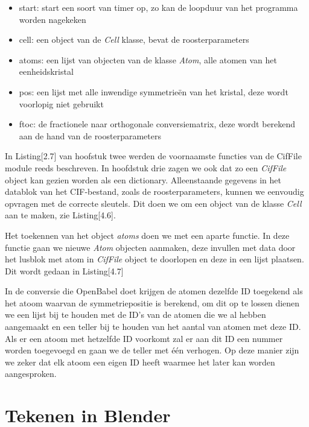 \begin{itemize}
\item start: start een soort van timer op, zo kan de loopduur van het programma worden nagekeken
\item cell: een object van de \textit{Cell} klasse, bevat de roosterparameters
\item atoms: een lijst van objecten van de klasse \textit{Atom}, alle atomen van het eenheidskristal
\item pos: een lijst met alle inwendige symmetrieën van het kristal, deze wordt voorlopig niet gebruikt
\item ftoc: de fractionele naar orthogonale conversiematrix, deze wordt berekend aan de hand van de roosterparameters
\end{itemize}

In Listing[2.7] van hoofstuk twee werden de voornaamste functies van de CifFile module reeds beschreven. In hoofdstuk drie zagen we ook dat zo een \textit{CifFile} object kan gezien worden als een dictionary. Alleenstaande gegevens in het datablok van het CIF-bestand, zoals de roosterparameters, kunnen we eenvoudig opvragen met de correcte sleutels. Dit doen we om een object van de klasse \textit{Cell} aan te maken, zie Listing[4.6].



Het toekennen van het object \textit{atoms} doen we met een aparte functie. In deze functie gaan we nieuwe \textit{Atom} objecten aanmaken, deze invullen met data door het lusblok met atom in \textit{CifFile} object te doorlopen en deze in een lijst plaatsen. Dit wordt gedaan in Listing[4.7] 



In de conversie die OpenBabel doet krijgen de atomen dezelfde ID toegekend als het atoom waarvan de symmetriepositie is berekend, om dit op te lossen dienen we een lijst bij te houden met de ID's van de atomen die we al hebben aangemaakt en een teller bij te houden van het aantal van atomen met deze ID. Als er een atoom met hetzelfde ID voorkomt zal er aan dit ID een nummer worden toegevoegd en gaan we de teller met één verhogen. Op deze manier zijn we zeker dat elk atoom een eigen ID heeft waarmee het later kan worden aangesproken.    

\section{Tekenen in Blender}

